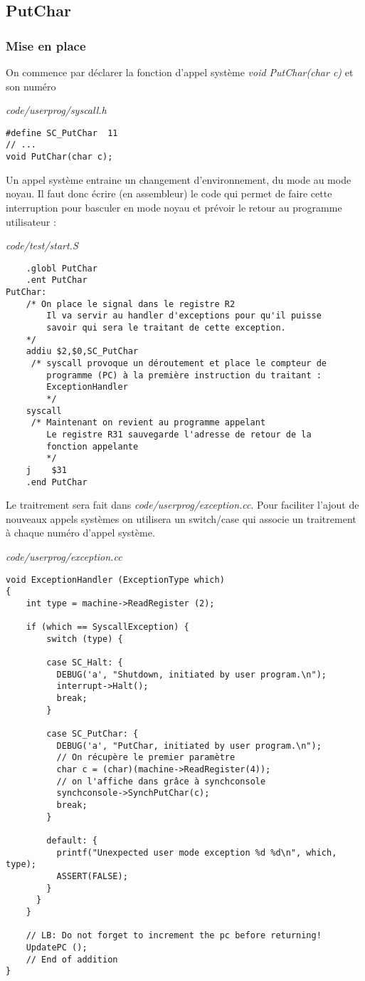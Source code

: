 \documentclass[a4paper,10pt]{article}
\begin{document}
\subsection{PutChar}
\subsubsection{Mise en place}
On commence par déclarer la fonction d'appel système \textit{void PutChar(char
c)} et son numéro

\textit{code/userprog/syscall.h}
\begin{lstlisting}
#define SC_PutChar  11
// ...
void PutChar(char c);
\end{lstlisting}

Un appel système entraine un changement d'environnement, du mode au mode noyau.
Il faut donc écrire (en assembleur) le code qui permet de faire cette
interruption pour basculer en mode noyau et prévoir le retour au programme
utilisateur :

\textit{code/test/start.S}
\begin{lstlisting}
    .globl PutChar
    .ent PutChar
PutChar:
    /* On place le signal dans le registre R2
        Il va servir au handler d'exceptions pour qu'il puisse
        savoir qui sera le traitant de cette exception.
    */
    addiu $2,$0,SC_PutChar
     /* syscall provoque un déroutement et place le compteur de
        programme (PC) à la première instruction du traitant :
        ExceptionHandler
        */
    syscall
     /* Maintenant on revient au programme appelant
        Le registre R31 sauvegarde l'adresse de retour de la
        fonction appelante
        */
    j    $31
    .end PutChar
\end{lstlisting}

Le traitrement sera fait dans \textit{code/userprog/exception.cc}. Pour
faciliter l'ajout de nouveaux appels systèmes on utilisera un switch/case qui
associe un traitrement à chaque numéro d'appel système.

\textit{code/userprog/exception.cc}
\begin{lstlisting}
void ExceptionHandler (ExceptionType which)
{
    int type = machine->ReadRegister (2);

    if (which == SyscallException) {
        switch (type) {

        case SC_Halt: {
          DEBUG('a', "Shutdown, initiated by user program.\n");
          interrupt->Halt();
          break;
        }

        case SC_PutChar: {
          DEBUG('a', "PutChar, initiated by user program.\n");
          // On récupère le premier paramètre
          char c = (char)(machine->ReadRegister(4));
          // on l'affiche dans grâce à synchconsole
          synchconsole->SynchPutChar(c);
          break;
        }

        default: {
          printf("Unexpected user mode exception %d %d\n", which, type);
          ASSERT(FALSE);
        }
      }
    }

    // LB: Do not forget to increment the pc before returning!
    UpdatePC ();
    // End of addition
}
\end{lstlisting}
\end{document}
